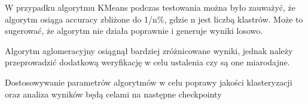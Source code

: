 \documentclass{classrep}
\begin{document}
{{            W przypadku algorytmu KMeans podczas testowania można było zauważyć, że algorytm osiąga accuracy zbliżone do 1/n\%, gdzie n jest liczbą klastrów. Może to sugerować, że algorytm nie działa poprawnie i generuje wyniki losowo.
            
            Algorytm aglomeracyjny osiągnął bardziej zróżnicowane wyniki, jednak należy przeprowadzić dodatkową weryfikację w celu ustalenia czy są one miarodajne.
            
            Dostosowywanie parametrów algorytmów w celu poprawy jakości klasteryzacji oraz analiza wyników będą celami na następne checkpointy
        }
    }


    \begin{thebibliography}{0}
    \end{thebibliography}
\end{document}
